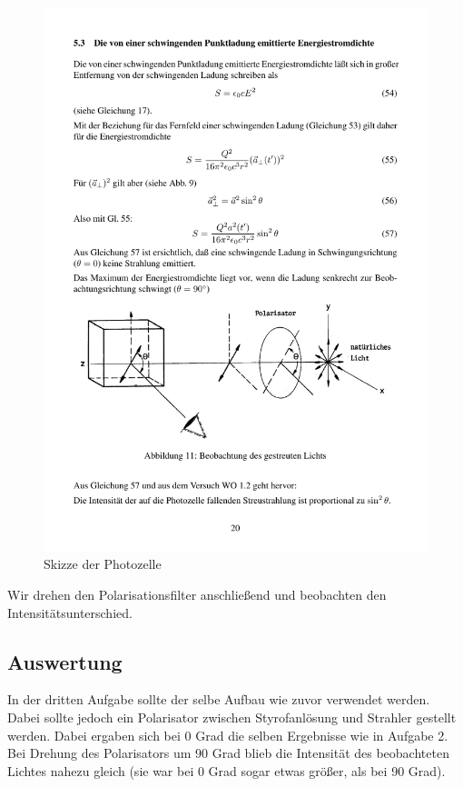 \documentclass[12pt]{scrartcl}
\begin{document}
\begin{figure}[H] 
  \centering
    \includegraphics[trim = 0mm 40mm 0mm 113mm, clip, scale = 1]{abb_11.pdf}
  	\caption[Skizze der Photozelle]{Skizze der Photozelle\footnotemark}
  \label{fig:abb_11}
\end{figure}

Wir drehen den Polarisationsfilter anschließend und beobachten den Intensitätsunterschied.
\subsection{Auswertung}
In der dritten Aufgabe sollte der selbe Aufbau wie zuvor verwendet werden. Dabei sollte jedoch ein Polarisator zwischen Styrofanlösung und Strahler gestellt werden. Dabei ergaben sich bei 0 Grad die selben Ergebnisse wie in Aufgabe 2. Bei Drehung des Polarisators um 90 Grad blieb die Intensität des beobachteten Lichtes nahezu gleich (sie war bei 0 Grad sogar etwas größer, als bei 90 Grad).
\end{document}
